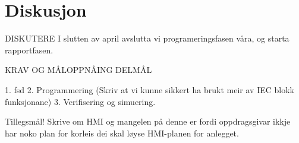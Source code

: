 \chapter{Diskusjon}
\thispagestyle{fancy}
DISKUTERE
I slutten av april avslutta vi programeringsfasen våra, og starta rapportfasen.

KRAV OG MÅLOPPNÅING
DELMÅL

1. fsd 
2. Programmering (Skriv at vi kunne sikkert ha brukt meir av IEC blokk funksjonane)
3. Verifisering og simuering.

Tillegsmål!
Skrive om HMI og mangelen på denne er fordi oppdragsgivar ikkje har noko plan for korleis
dei skal løyse HMI-planen for anlegget. 
